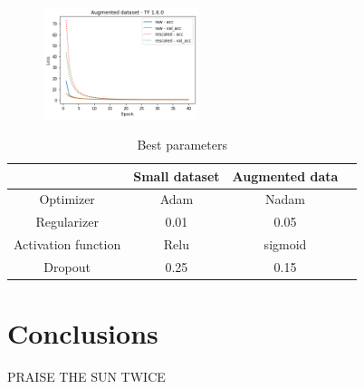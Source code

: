\documentclass[prl,twocolumn]{revtex4-1}
\begin{document}
\begin{figure}[h!!]
	\includegraphics[width=0.40\textwidth]{aug_oldTFloss.png}
	\caption{}
	\label{fig:y}
\end{figure}
\begin{table}[ht]
\caption{Best parameters}
\begin{tabular}{c c c c}
\hline\hline
 & Small dataset & Augmented data &  \\ [0.5ex]
\hline
Optimizer & Adam & Nadam &   \\
Regularizer & 0.01 & 0.05 &  \\
Activation function & Relu & sigmoid &  \\Dropout & 0.25 & 0.15 &  \\ [1ex]
\hline
\end{tabular}
\label{table:nonlin}
\end{table}
\section{Conclusions}

PRAISE THE SUN TWICE

  





\begin{thebibliography}{99}


  
\end{thebibliography}
\end{document}
